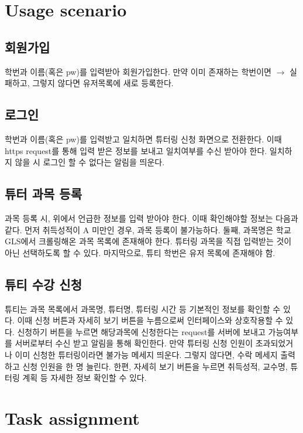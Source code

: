 \documentclass{lxaiproposal}
\begin{document}
\section{Usage scenario}
\vspace*{-3mm}
\subsection{회원가입}
학번과 이름(혹은 pw)를 입력받아 회원가입한다.
만약 이미 존재하는 학번이면 $\rightarrow$ 실패하고, 그렇지 않다면 유저목록에 새로 등록한다.

\subsection{로그인}
학번과 이름(혹은 pw)를 입력받고 일치하면 튜터링 신청 화면으로 전환한다. 이때 https request를 통해 입력 받은 정보를 보내고 일치여부를 수신 받아야 한다. 일치하지 않을 시 로그인 할 수 없다는 알림을 띄운다.

\subsection{튜터 과목 등록}
과목 등록 시, 위에서 언급한 정보를 입력 받아야 한다. 이때 확인해야할 정보는 다음과 같다.
먼저 취득성적이 A 미만인 경우, 과목 등록이 불가능하다. 둘째, 과목명은 학교 GLS에서 크롤링해온 과목 목록에 존재해야 한다. 튜터링 과목을 직접 입력받는 것이 아닌 선택하도록 할 수 있다.
마지막으로, 튜티 학번은 유저 목록에 존재해야 함.

\subsection{튜티 수강 신청}
튜티는 과목 목록에서 과목명, 튜터명, 튜터링 시간 등 기본적인 정보를 확인할 수 있다.
이때 신청 버튼과 자세히 보기 버튼을 누름으로써 인터페이스와 상호작용할 수 있다. 
신청하기 버튼을 누르면 해당과목에 신청한다는 request를 서버에 보내고 가능여부를 서버로부터 수신 받고 알림을 통해 확인한다.
만약 튜터링 신청 인원이 초과되었거나 이미 신청한 튜터링이라면 불가능 메세지 띄운다. 그렇지 않다면, 수락 메세지 출력하고 신청 인원을 한 명 늘린다.
한편, 자세히 보기 버튼을 누르면 취득성적, 교수명, 튜터링 계획 등 자세한 정보 확인할 수 있다.

\section{Task assignment}
\vspace*{-3mm}
\end{document}
